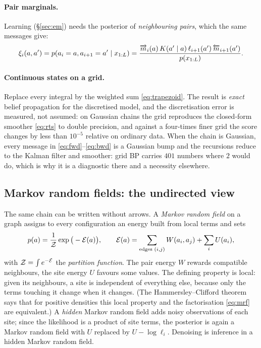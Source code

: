 \paragraph{Pair marginals.} Learning (\S\ref{sec:em}) needs the posterior of \emph{neighbouring pairs},
which the same messages give:
\begin{equation}\label{eq:pair}
  \xi_i(a,a')=p(a_i=a,a_{i+1}=a'\mid x_{1:L})=\frac{\overrightarrow{m}_i(a)\,K(a'\mid a)\,\ell_{i+1}(a')\,\overleftarrow{m}_{i+1}(a')}{p(x_{1:L})}.
\end{equation}

\paragraph{Continuous states on a grid.} Replace every integral by the weighted sum \eqref{eq:trapezoid}. The
result is \emph{exact} belief propagation for the discretised model, and the discretisation error is measured,
not assumed: on Gaussian chains the grid reproduces the closed-form smoother \eqref{eq:rts} to double
precision, and against a four-times finer grid the score changes by less than $10^{-5}$ relative on ordinary
data. When the chain is Gaussian, every message in \eqref{eq:fwd}--\eqref{eq:bwd} is a Gaussian bump and the
recursions reduce to the Kalman filter and smoother: grid BP carries $401$ numbers where $2$ would do, which is
why it is a diagnostic there and a necessity elsewhere.

\subsection{Markov random fields: the undirected view}

The same chain can be written without arrows. A \emph{Markov random field} on a graph assigns to every
configuration an energy built from local terms and sets
\begin{equation}\label{eq:mrf}
  p(a)=\frac{1}{\mathcal{Z}}\exp\big(-\mathcal{E}(a)\big),\qquad \mathcal{E}(a)=\sum_{\text{edges }(i,j)}W(a_i,a_j)+\sum_iU(a_i),
\end{equation}
with $\mathcal{Z}=\int e^{-\mathcal{E}}$ the \emph{partition function}. The pair energy $W$ rewards compatible neighbours, the
site energy $U$ favours some values. The defining property is local: given its neighbours, a site is
independent of everything else, because only the terms touching it change when it changes. (The
Hammersley--Clifford theorem says that for positive densities this local property and the factorisation
\eqref{eq:mrf} are equivalent.) A \emph{hidden} Markov random field adds noisy observations of each site;
since the likelihood is a product of site terms, the posterior is again a Markov random field with $U$
replaced by $U-\log\ell_i$. Denoising is inference in a hidden Markov random field.

